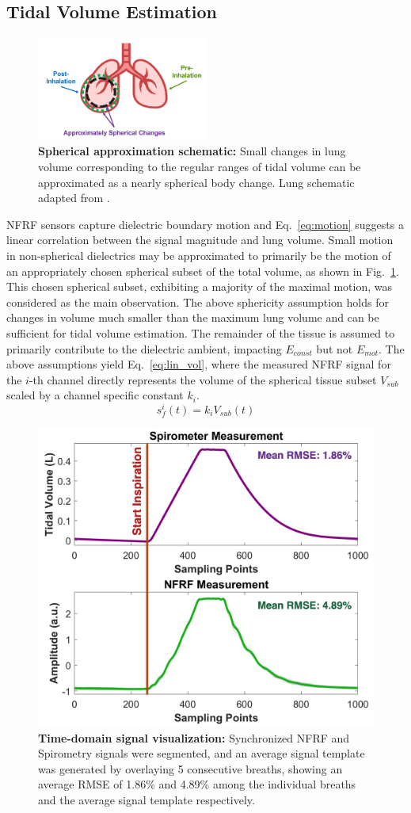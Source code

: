 \documentclass[journal,twoside,web]{ieeecolor}
\begin{document}
\subsection{Tidal Volume Estimation}
\begin{figure}[htbp]
    \centering
    \includegraphics[width=0.5\textwidth]{approx_sphere_v2.jpg}
    \caption{\textbf{Spherical approximation schematic:} Small changes in lung volume corresponding to the regular ranges of tidal volume can be approximated as a nearly spherical body change. Lung schematic adapted from \cite{lungImage}.}
    \label{fig:approx_sphere}
\end{figure}
NFRF sensors capture dielectric boundary motion and Eq.~\ref{eq:motion} suggests a linear correlation between the signal magnitude and lung volume. Small motion in non-spherical dielectrics may be approximated to primarily be the motion of an appropriately chosen spherical subset of the total volume, as shown in Fig.~\ref{fig:approx_sphere}. This chosen spherical subset, exhibiting a majority of the maximal motion, was considered as the main observation. The above sphericity assumption holds for changes in volume much smaller than the maximum lung volume and can be sufficient for tidal volume estimation. The remainder of the tissue is assumed to primarily contribute to the dielectric ambient, impacting $E_{const}$ but not $E_{mot}$. The above assumptions yield Eq.~\ref{eq:lin_vol}, where the measured NFRF signal for the $i$-th channel directly represents the volume of the spherical tissue subset $V_{sub}$ scaled by a channel specific constant $k_i$. 
\begin{equation}
    s_f^{i}(t) = k_{i} V_{sub}(t)
    \label{eq:lin_vol}
\end{equation}
\begin{figure}[h]
\centering
\includegraphics[width=.48\textwidth]{ncs_spiro2.jpg}
\caption{\textbf{Time-domain signal visualization:} Synchronized NFRF and Spirometry signals were segmented, and an average signal template was generated by overlaying 5 consecutive breaths, showing an average RMSE of 1.86\% and 4.89\% among the individual breaths and the average signal template respectively.}
\label{fig:ncs_spiro_time}
\end{figure}
\end{document}
